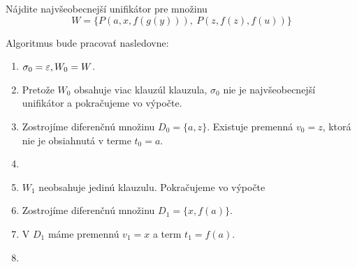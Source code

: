 \begin{priklad}
    Nájdite najvšeobecnejší unifikátor pre množinu
    \begin{equation*}
        W=\{ P(a,x,f(g(y))),\ P(z,f(z),f(u)) \}
    \end{equation*}

    Algoritmus bude pracovať nasledovne:
    \begin{enumerate}
	\item $\sigma_0 = \varepsilon, W_0 = W$.

        \item Pretože $W_0$ obsahuje viac klauzúl klauzula,
            $\sigma_0$ nie je najvšeobecnejší unifikátor a pokračujeme
            vo výpočte.

	\item Zostrojíme diferenčnú množinu $D_0 = \{a, z\}$.
            Existuje premenná $v_0 = z$, 
            ktorá nie je obsiahnutá v terme $t_0 = a$.

	\item {}
            

	\item $W_1$ neobsahuje jedinú klauzulu. Pokračujeme vo výpočte
        \item Zostrojíme diferenčnú množinu $D_1 = \{x, f(a)\}$.

	\item V $D_1$ máme premennú $v_1 = x$ a term $t_1 = f(a)$.

	\item {}


\end{enumerate}
\end{priklad}
